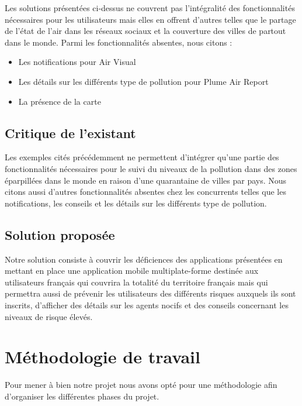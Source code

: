 \qquad Les solutions présentées ci-dessus ne couvrent pas l'intégralité des fonctionnalités nécessaires pour les utilisateurs mais elles en offrent d'autres telles que le partage de l'état de l'air dans les réseaux sociaux et la couverture des villes de partout dans le monde. Parmi les fonctionnalités absentes, nous citons :
\begin{itemize}
	\item Les notifications pour Air Visual
	\item Les détails sur les différents type de pollution pour Plume Air Report
	\item La présence de la carte
\end{itemize} 

\subsection{Critique de l'existant}

\qquad Les exemples cités précédemment ne permettent d'intégrer qu'une partie des fonctionnalités nécessaires pour le suivi du niveaux de la pollution dans des zones éparpillées dans le monde en raison d'une quarantaine de villes par pays. Nous citons aussi d'autres fonctionnalités absentes chez les concurrents telles que les notifications, les conseils et les détails sur les différents type de pollution.

\subsection{Solution proposée}

\qquad Notre solution consiste à couvrir les déficiences des applications présentées en mettant en place une application mobile multiplate-forme destinée aux utilisateurs français qui couvrira la totalité du territoire français mais qui permettra aussi de prévenir les utilisateurs des différents risques auxquels ils sont inscrits, d'afficher des détails sur les agents nocifs et des conseils concernant les niveaux de risque élevés.\\

\section{Méthodologie de travail}

\qquad Pour mener à bien notre projet nous avons opté pour une méthodologie afin d'organiser les différentes phases du projet.\\

